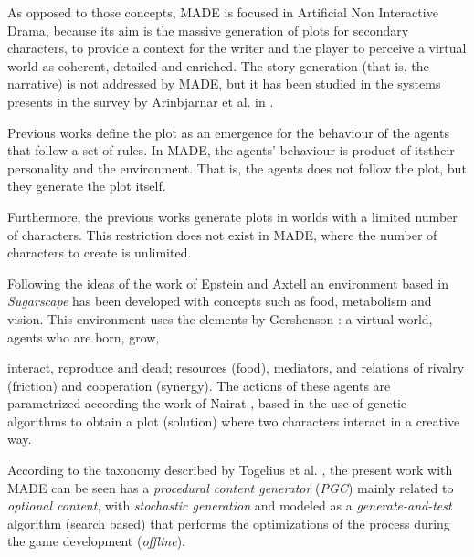 \documentclass{sig-alternate}
\begin{document}
As opposed to those concepts, MADE is focused in Artificial Non
Interactive Drama, because its aim is the massive generation of plots
for secondary characters, to provide a context for the writer and the
player to perceive a virtual world as coherent, detailed and
enriched. The story generation (that is, the narrative) is not
addressed by MADE, but it has been studied in the systems presents in
the survey by Arinbjarnar et al. in \cite{ReviewArinbjarnar09}. 


Previous works define the plot as an emergence for the behaviour of the agents that follow a set of rules. In MADE, the agents' behaviour is product of itstheir personality and the environment. That is, the agents does not follow the plot, but they generate the plot itself.


Furthermore, the previous works generate plots in worlds with a limited number of characters. This restriction does not exist in MADE, where the number of characters to create is unlimited.



Following the ideas of the work of Epstein and Axtell
\cite{epstein1996growing} an environment based in {\em Sugarscape} has
been developed with concepts such as food, metabolism and
vision. This environment uses the elements by Gershenson
\cite{gershenson2005general}: a virtual world, agents who are born, grow,

interact, reproduce and dead; resources (food), mediators, and
relations of rivalry (friction) and cooperation (synergy). The actions
of these agents are parametrized according the work of Nairat
\cite{nairat2011character}, based in the use of genetic algorithms to
obtain a plot (solution) where two characters interact in a creative way.

According to the taxonomy described by Togelius et al. \cite{Togelius2011}, the present work
with MADE can be seen has a \textit{procedural content generator} (\textit{PGC})
mainly related to \textit{optional content}, with \textit{stochastic generation}
and modeled as a \textit{generate-and-test} algorithm (search based) that
performs the optimizations of the process during the game development (\textit{offline}).

\end{document}
